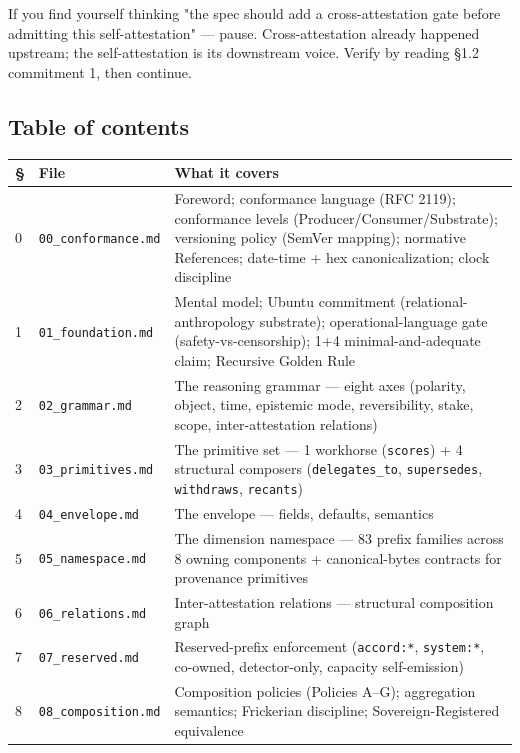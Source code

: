 \documentclass[10pt]{article}
\begin{document}
If you find yourself thinking "the spec should add a cross-attestation gate before admitting this self-attestation" — pause. Cross-attestation already happened upstream; the self-attestation is its downstream voice. Verify by reading §1.2 commitment 1, then continue.



\subsection*{Table of contents}


{\footnotesize
\begin{longtable}{|p{5.33cm}|p{5.33cm}|p{5.33cm}|}\hline
\textbf{§} & \textbf{File} & \textbf{What it covers} \\ \hline\endhead
0 & \texttt{00\_conformance.md} & Foreword; conformance language (RFC 2119); conformance levels (Producer/Consumer/Substrate); versioning policy (SemVer mapping); normative References; date-time + hex canonicalization; clock discipline \\ \hline
1 & \texttt{01\_foundation.md} & Mental model; Ubuntu commitment (relational-anthropology substrate); operational-language gate (safety-vs-censorship); 1+4 minimal-and-adequate claim; Recursive Golden Rule \\ \hline
2 & \texttt{02\_grammar.md} & The reasoning grammar — eight axes (polarity, object, time, epistemic mode, reversibility, stake, scope, inter-attestation relations) \\ \hline
3 & \texttt{03\_primitives.md} & The primitive set — 1 workhorse (\texttt{scores}) + 4 structural composers (\texttt{delegates\_to}, \texttt{supersedes}, \texttt{withdraws}, \texttt{recants}) \\ \hline
4 & \texttt{04\_envelope.md} & The envelope — fields, defaults, semantics \\ \hline
5 & \texttt{05\_namespace.md} & The dimension namespace — 83 prefix families across 8 owning components + canonical-bytes contracts for provenance primitives \\ \hline
6 & \texttt{06\_relations.md} & Inter-attestation relations — structural composition graph \\ \hline
7 & \texttt{07\_reserved.md} & Reserved-prefix enforcement (\texttt{accord:*}, \texttt{system:*}, co-owned, detector-only, capacity self-emission) \\ \hline
8 & \texttt{08\_composition.md} & Composition policies (Policies A–G); aggregation semantics; Frickerian discipline; Sovereign-Registered equivalence \\ \hline

\end{longtable}}
\end{document}
